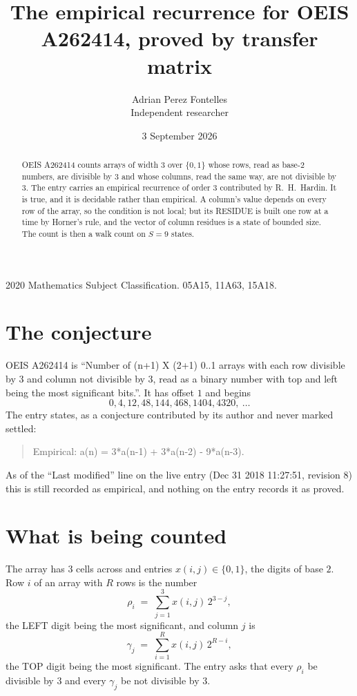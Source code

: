 \documentclass[11pt,a4paper]{article}
\title{The empirical recurrence for OEIS A262414, proved by transfer matrix}
\author{Adrian Perez Fontelles\\ \small Independent researcher}
\date{3 September 2026}
\theoremstyle{plain}
\theoremstyle{definition}
\begin{document}
\maketitle

\begin{abstract}
OEIS A262414 counts arrays of width $3$ over $\{0,1\}$ whose rows, read as base-$2$
numbers, are divisible by $3$ and whose columns, read the same way, are not divisible by
$3$. The entry carries an empirical recurrence of order $3$ contributed by
R.~H.~Hardin. It is true, and it is decidable rather than empirical. A column's value depends on
every row of the array, so the condition is not local; but its RESIDUE is built one row at a
time by Horner's rule, and the vector of column residues is a state of bounded size. The count
is then a walk count on $S=9$ states.
\end{abstract}

\noindent\small 2020 Mathematics Subject Classification. 05A15, 11A63, 15A18.\normalsize

\section{The conjecture}

OEIS A262414 is ``Number of (n+1) X (2+1) 0..1 arrays with each row divisible by 3 and column not divisible by 3, read as a binary number with top and left being the most significant bits.''. It has offset $1$ and begins
\[
0, 4, 12, 48, 144, 468, 1404, 4320,\ \dots
\]
The entry states, as a conjecture contributed by its author and never marked settled:
\begin{quote}
Empirical: a(n) = 3*a(n-1) + 3*a(n-2) - 9*a(n-3).
\end{quote}
As of the ``Last modified'' line on the live entry (Dec 31 2018 11:27:51, revision 8) this is still
recorded as empirical, and nothing on the entry records it as proved.

\section{What is being counted}

The array has $3$ cells across and entries $x(i,j)\in\{0,1\}$, the digits of
base $2$. Row $i$ of an array with $R$ rows is the number
\[
\rho_i\;=\;\sum_{j=1}^{3}x(i,j)\,2^{3-j} ,
\]
the LEFT digit being the most significant, and column $j$ is
\[
\gamma_j\;=\;\sum_{i=1}^{R}x(i,j)\,2^{R-i} ,
\]
the TOP digit being the most significant. The entry asks that every $\rho_i$ be divisible by
$3$ and every $\gamma_j$ be not divisible by $3$.
\end{document}
